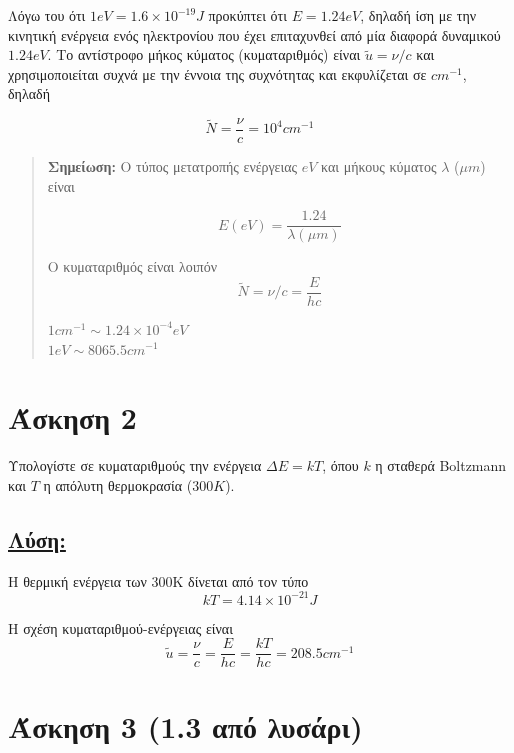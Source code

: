\documentclass[a4paper,11pt,titlepage]{article}
\begin{document}
Λόγω του ότι $1eV=1.6\times10^{-19}J$ προκύπτει ότι $E=1.24eV$, δηλαδή ίση με την κινητική ενέργεια ενός ηλεκτρονίου που έχει επιταχυνθεί  από μία διαφορά δυναμικού $1.24eV$. Το αντίστροφο μήκος κύματος (κυματαριθμός) είναι $\widetilde{u}=\nu/c$ και χρησιμοποιείται συχνά με την έννοια της συχνότητας και εκφυλίζεται σε $cm^{-1}$, δηλαδή  

\begin{equation}
\widetilde{N}=\frac{\nu}{c}=10^4cm^{-1} 
\end{equation}
\begin{quote}
\textbf{Σημείωση:} Ο τύπος μετατροπής ενέργειας $eV$ και μήκους κύματος $\lambda$ (${\mu}m$) είναι

\begin{equation}
 E(eV)=\frac{1.24}{\lambda({\mu}m)}
\end{equation}

Ο κυματαριθμός είναι λοιπόν
\begin{equation}
 \widetilde{N}=\nu/c=\frac{E}{hc}
\end{equation}

$1cm^{-1}\sim1.24\times10^{-4}eV$\\ $1eV\sim8065.5 cm^{-1}$
\end{quote}
\newpage
\section{Άσκηση 2}

Υπολογίστε σε κυματαριθμούς την ενέργεια ${\Delta}E=kT$, όπου $k$ η σταθερά Boltzmann και $T$ η απόλυτη θερμοκρασία ($300K$).

\subsection*{\underline{Λύση:}}

Η θερμική ενέργεια των 300K δίνεται από τον τύπο
\begin{equation}
 kT=4.14\times10^{-21} J
\end{equation}

Η σχέση κυματαριθμού-ενέργειας είναι
\begin{equation}
 \widetilde{u}=\frac{\nu}{c}=\frac{E}{hc}=\frac{kT}{hc}=208.5 cm^{-1}
\end{equation}

\section{Άσκηση 3 (1.3 από λυσάρι)}
\end{document}
